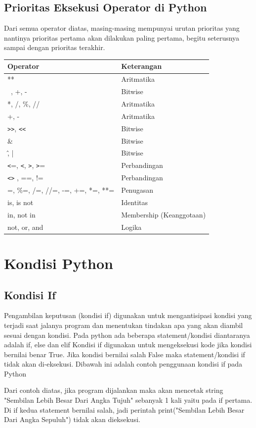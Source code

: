 \subsection{Prioritas Eksekusi Operator di Python}
Dari semua operator diatas, masing-masing mempunyai urutan prioritas yang nantinya prioritas pertama akan dilakukan paling pertama, begitu seterusnya sampai dengan prioritas terakhir.
\begin{center}
\begin{tabular}{ | m{4cm} | m{4cm} | }
\hline
Operator & Keterangan \\
\hline
** & Aritmatika \\
\hline
~, +, - & Bitwise \\
\hline
*, /, \%, // & Aritmatika \\
\hline
+, - & Aritmatika \\
\hline
\texttt{>>}, \texttt{<<} & Bitwise \\
\hline
\& & Bitwise \\
\hline
\^, | & Bitwise \\
\hline
\texttt{<}=, \texttt{<}, \texttt{>}, \texttt{>}= & Perbandingan \\
\hline
\texttt{<>} , ==, != & Perbandingan \\
\hline
=, \%=, /=, //=, -=, +=, *=, **= & Penugasan \\
\hline
is, is not & Identitas \\
\hline
in, not in & Membership (Keanggotaan) \\
\hline
not, or, and & Logika \\
\hline
\end{tabular}
\end{center}


\section{Kondisi Python}

\subsection{Kondisi If}
Pengambilan keputusan (kondisi if) digunakan untuk mengantisipasi kondisi yang terjadi saat jalanya program dan menentukan tindakan apa yang akan diambil sesuai dengan kondisi. Pada python ada beberapa statement/kondisi diantaranya adalah if, else dan elif Kondisi if digunakan untuk mengeksekusi kode jika kondisi bernilai benar True. Jika kondisi bernilai salah False maka statement/kondisi if tidak akan di-eksekusi. Dibawah ini adalah contoh penggunaan kondisi if pada Python

Dari contoh diatas, jika program dijalankan maka akan mencetak string "Sembilan Lebih Besar Dari Angka Tujuh" sebanyak 1 kali yaitu pada if pertama. Di if kedua statement bernilai salah, jadi perintah print("Sembilan Lebih Besar Dari Angka Sepuluh") tidak akan dieksekusi.


